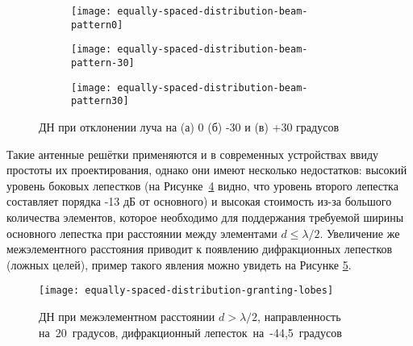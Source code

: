 \begin{figure}[!ht]
    \centering
    \begin{subfigure}[b]{0.55\textwidth}
        \centering
        \hspace*{-3.5ex}
        \texttt{[image: equally-spaced-distribution-beam-pattern0]}
        \caption{}%
        \label{fig:equally-spaced-distribution-beam-pattern0}
    \end{subfigure}
    \hfill
    \begin{subfigure}[b]{0.49\textwidth}
        \centering
        \hspace*{-3ex}
        \texttt{[image: equally-spaced-distribution-beam-pattern-30]}
        \caption{}%
        \label{fig:equally-spaced-distribution-beam-pattern-30}
    \end{subfigure}
    \begin{subfigure}[b]{0.49\textwidth}
        \centering
        \hspace*{-3ex}
        \texttt{[image: equally-spaced-distribution-beam-pattern30]}
        \caption{}%
        \label{fig:equally-spaced-distribution-beam-pattern30}
    \end{subfigure}
    \caption{%
        ДН при отклонении луча на
        (а) 0
        (б) -30 и
        (в) +30 градусов
    }%
    \label{fig:equally-spaced-distribution}
\end{figure}

Такие антенные решётки применяются и в современных устройствах ввиду простоты их проектирования, 
однако они имеют несколько недостатков: высокий уровень боковых лепестков 
(на Рисунке~\ref{fig:equally-spaced-distribution} видно, что уровень второго лепестка составляет порядка -13 дБ от основного) 
и высокая стоимость из-за большого количества элементов, которое необходимо для поддержания требуемой
ширины основного лепестка при расстоянии между элементами $d \leq \lambda/2$. 
Увеличение же межэлементного расстояния приводит к появлению дифракционных 
лепестков (ложных целей), пример такого явления можно увидеть на Рисунке \ref{fig:equally-spaced-distribution-granting-lobes}.

\begin{figure}[!ht]
    \centering
    \hspace*{-3ex}
    \texttt{[image: equally-spaced-distribution-granting-lobes]}
    \caption{ДН при межэлементном расстоянии $d > \lambda/2$,
        направленность на~20~градусов,
        дифракционный лепесток~на~-44,5~градусов}%
    \label{fig:equally-spaced-distribution-granting-lobes}
\end{figure}

